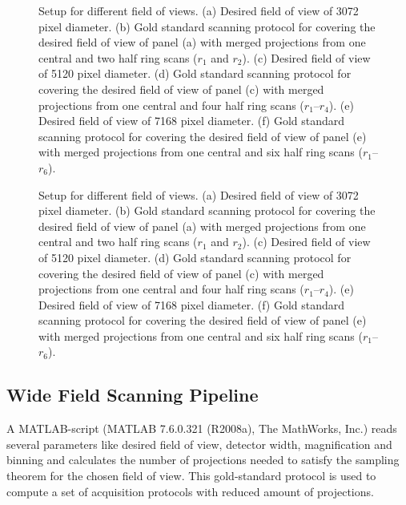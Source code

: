 \ifiucr
	\begin{figure}%
		\centering%
		\caption{Setup for different field of views. %
		(a) Desired field of view of 3072 pixel diameter. %
		(b) Gold standard scanning protocol for covering the desired field of view of panel (a) with merged projections from one central and two half ring scans ($r_{1}$ and $r_{2}$). %
		(c) Desired field of view of 5120 pixel diameter. %
		(d) Gold standard scanning protocol for covering the desired field of view of panel (c) with merged projections from one central and four half ring scans ($r_{1}$--$r_{4}$). %
		(e) Desired field of view of 7168 pixel diameter. %
		(f) Gold standard scanning protocol for covering the desired field of view of panel (e) with merged projections from one central and six half ring scans ($r_{1}$--$r_{6}$).%
		}%
		
		\label{fig:SubScan-Setup}%
	\end{figure}%
\else
	\begin{figure*}[htp]
		\centering%
		
		\caption{Setup for different field of views. %
		(a) Desired field of view of 3072 pixel diameter. %
		(b) Gold standard scanning protocol for covering the desired field of view of panel (a) with merged projections from one central and two half ring scans ($r_{1}$ and $r_{2}$). %
		(c) Desired field of view of 5120 pixel diameter. %
		(d) Gold standard scanning protocol for covering the desired field of view of panel (c) with merged projections from one central and four half ring scans ($r_{1}$--$r_{4}$). %
		(e) Desired field of view of 7168 pixel diameter. %
		(f) Gold standard scanning protocol for covering the desired field of view of panel (e) with merged projections from one central and six half ring scans ($r_{1}$--$r_{6}$).%
		}%
		\label{fig:SubScan-Setup}%
	\end{figure*}
\fi

\subsection{Wide Field Scanning Pipeline}%
\label{subsec:wfs-setup}%
A MATLAB-script (MATLAB\textsuperscript{\textregistered} 7.6.0.321 (R2008a), The MathWorks, Inc.) reads several parameters like desired field of view, detector width, magnification and binning and calculates the number of projections needed to satisfy the sampling theorem for the chosen field of view. This gold-standard protocol is used to compute a set of acquisition protocols with reduced amount of projections.


